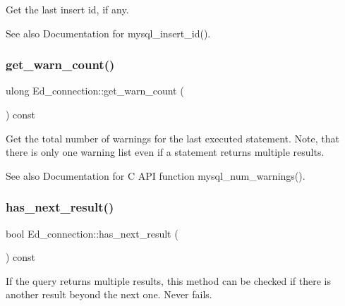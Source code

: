 Get the last insert id, if any.

\begin{DoxySeeAlso}{See also}
Documentation for mysql\+\_\+insert\+\_\+id(). 
\end{DoxySeeAlso}
\mbox{\label{classEd__connection_afc2fcf1d521b29f06621fc01714b69a0}} 
\subsubsection{\texorpdfstring{get\+\_\+warn\+\_\+count()}{get\_warn\_count()}}
{\footnotesize\ttfamily ulong Ed\+\_\+connection\+::get\+\_\+warn\+\_\+count (\begin{DoxyParamCaption}{ }\end{DoxyParamCaption}) const\hspace{0.3cm}{\ttfamily [inline]}}

Get the total number of warnings for the last executed statement. Note, that there is only one warning list even if a statement returns multiple results.

\begin{DoxySeeAlso}{See also}
Documentation for C A\+PI function mysql\+\_\+num\+\_\+warnings(). 
\end{DoxySeeAlso}
\mbox{\label{classEd__connection_a6f1e1b950bf2e7c332e73579f1a2fd51}} 
\subsubsection{\texorpdfstring{has\+\_\+next\+\_\+result()}{has\_next\_result()}}
{\footnotesize\ttfamily bool Ed\+\_\+connection\+::has\+\_\+next\+\_\+result (\begin{DoxyParamCaption}{ }\end{DoxyParamCaption}) const\hspace{0.3cm}{\ttfamily [inline]}}

If the query returns multiple results, this method can be checked if there is another result beyond the next one. Never fails. \mbox{\label{classEd__connection_aa4c7282bcb1c1fdf2fa966a2106c71bd}} 
